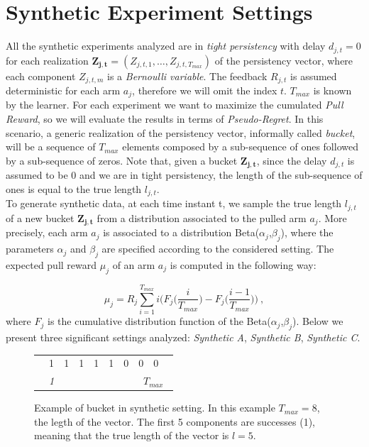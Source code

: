 \section{Synthetic Experiment Settings}
All the synthetic experiments analyzed are in \emph{tight persistency} with delay $d_{j,t}=0$ for each realization $\boldsymbol{Z_{j,t}} = (Z_{j,t,1},\dots,Z_{j,t,T_{max}})$ of the persistency vector, where each component $Z_{j,t,m}$ is a \emph{Bernoulli variable}. The feedback $R_{j, t}$ is assumed deterministic for each arm $a_j$, therefore we will omit the index $t$. $T_{max}$ is known by the learner. For each experiment we want to maximize the cumulated \emph{Pull Reward}, so we will evaluate the results in terms of \emph{Pseudo-Regret}. In this scenario, a generic realization of the persistency vector, informally called \emph{bucket}, will be a sequence of $T_{max}$ elements composed by a sub-sequence of ones followed by a sub-sequence of zeros. Note that, given a bucket $\boldsymbol{Z_{j,t}}$, since the delay $d_{j,t}$ is assumed to be 0 and we are in tight persistency, the length of the sub-sequence of ones is equal to the true length $l_{j,t}$.\\
To generate synthetic data, at each time instant t, we sample the true length $l_{j,t}$ of a new bucket $\boldsymbol{Z_{j,t}}$ from a distribution associated to the pulled arm $a_j$. More precisely, each arm $a_j$ is associated to a distribution Beta($\alpha_j$,$\beta_j$), where the parameters $\alpha_j$ and $\beta_j$ are specified according to the considered setting. The expected pull reward $\mu_j$ of an arm $a_j$ is computed in the following way:

$$\mu_j = R_j\sum_{i=1}^{T_{max}}i\bigg(F_j\bigg(\frac{i}{T_{max}}\bigg)-F_j\bigg(\frac{i-1}{T_{max}}\bigg)\bigg) \ ,$$
where $F_j$ is the cumulative distribution function of the Beta($\alpha_j$,$\beta_j$).
Below we present three significant settings analyzed: \emph{Synthetic A}, \emph{Synthetic B}, \emph{Synthetic C}.

\begin{figure}[t]
	\centering
	\begin{tabular}{llllllllll}
		\cline{2-9}
		\multicolumn{1}{l|}{} & \multicolumn{1}{l|}{1} & \multicolumn{1}{l|}{1} & \multicolumn{1}{l|}{1} & \multicolumn{1}{l|}{1} & \multicolumn{1}{l|}{1} & \multicolumn{1}{l|}{0} & \multicolumn{1}{l|}{0} & \multicolumn{1}{l|}{0} &  \\ \cline{2-9}
		& \textit{1}             & \textit{}              &                        &                        &                        &                        & \multicolumn{3}{c}{\textit{ $T_{max}$}}                 
	\end{tabular}
	\caption{Example of bucket in synthetic setting. In this example $T_{max}=8$, the legth of the vector. The first 5 components are successes (1), meaning that the true length of the vector is $l=5$.}
\end{figure}
